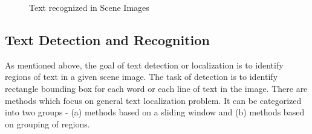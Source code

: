 \begin{figure}[t]
\centering
{}
\caption
{Text recognized in Scene Images}
\label{fig:recog}
\end{figure}


\subsection{Text Detection and Recognition}

As mentioned above, the goal of text detection or localization is to identify regions
of text in a given scene image. The task of detection is 
to identify rectangle bounding box for each word or each line of text in the image.
There are methods which focus on general text localization problem.
It can be categorized into
two groups - (a) methods based on a sliding window and (b) methods based
on grouping of regions. 

